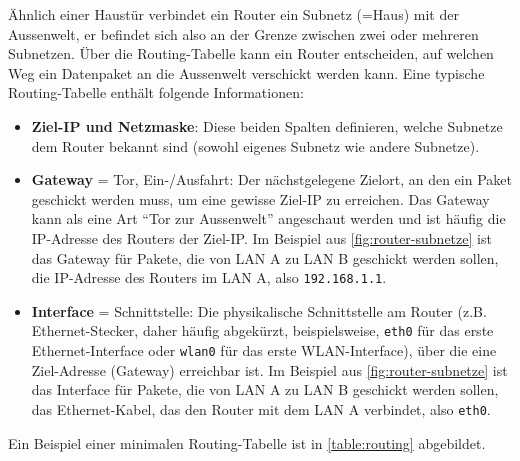 Ähnlich einer Haustür verbindet ein Router ein Subnetz (=Haus) mit der Aussenwelt, er befindet sich also an der Grenze zwischen zwei oder mehreren Subnetzen. Über die Routing-Tabelle kann ein Router entscheiden, auf welchen Weg ein Datenpaket an die Aussenwelt verschickt werden kann. Eine typische Routing-Tabelle enthält folgende Informationen:

\begin{itemize}
	\item \textbf{Ziel-\gls{IP} und Netzmaske}: Diese beiden Spalten definieren, welche Subnetze dem Router bekannt sind (sowohl eigenes Subnetz wie andere Subnetze).
	\item \textbf{Gateway} = Tor, Ein-/Ausfahrt: Der nächstgelegene Zielort, an den ein Paket geschickt werden muss, um eine gewisse Ziel-\gls{IP} zu erreichen. Das Gateway kann als eine Art \enquote{Tor zur Aussenwelt} angeschaut werden und ist häufig die \gls{IP}-Adresse des Routers der Ziel-\gls{IP}. Im Beispiel aus \cref{fig:router-subnetze} ist das Gateway für Pakete, die von \gls{LAN} A zu \gls{LAN} B geschickt werden sollen, die \gls{IP}-Adresse des Routers im \gls{LAN} A, also \texttt{192.168.1.1}.
	\item \textbf{Interface} = Schnittstelle: Die physikalische Schnittstelle am Router (z.B. Ethernet-Stecker, daher häufig abgekürzt, beispielsweise, \texttt{eth0} für das erste Ethernet-Interface oder \texttt{wlan0} für das erste \gls{WLAN}-Interface), über die eine Ziel-Adresse (Gateway) erreichbar ist. Im Beispiel aus \cref{fig:router-subnetze} ist das Interface für Pakete, die von \gls{LAN} A zu \gls{LAN} B geschickt werden sollen, das Ethernet-Kabel, das den Router mit dem \gls{LAN} A verbindet, also \texttt{eth0}.
\end{itemize}

Ein Beispiel einer minimalen Routing-Tabelle ist in \cref{table:routing} abgebildet.


